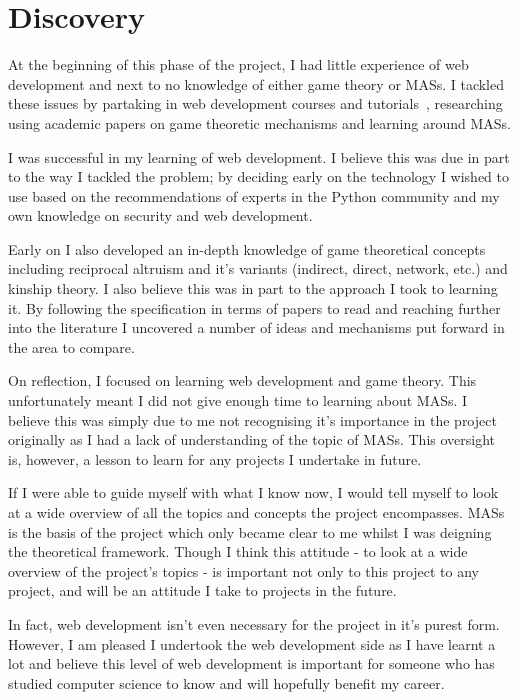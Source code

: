 \documentclass[]{final_report}
\begin{document}
\section{Discovery}
At the beginning of this phase of the project, I had little experience of web development and next to no knowledge of either game theory or MASs. I tackled these issues by partaking in web development courses and tutorials~\cite{flask_tut, swi_web_tut}, researching using academic papers on game theoretic mechanisms and learning around MASs.\par 
I was successful in my learning of web development. I believe this was due in part to the way I tackled the problem; by deciding early on the technology I wished to use based on the recommendations of experts in the Python community and my own knowledge on security and web development.\par 
Early on I also developed an in-depth knowledge of game theoretical concepts including reciprocal altruism and it's variants (indirect, direct, network, etc.) and kinship theory. I also believe this was in part to the approach I took to learning it. By following the specification in terms of papers to read and reaching further into the literature I uncovered a number of ideas and mechanisms put forward in the area to compare.\par 
On reflection, I focused on learning web development and game theory. This unfortunately meant I did not give enough time to learning about MASs. I believe this was simply due to me not recognising it's importance in the project originally as I had a lack of understanding of the topic of MASs. This oversight is, however, a lesson to learn for any projects I undertake in future.\par
If I were able to guide myself with what I know now, I would tell myself to look at a wide overview of all the topics and concepts the project encompasses. MASs is the basis of the project which only became clear to me whilst I was deigning the theoretical framework. Though I think this attitude - to look at a wide overview of the project's topics - is important not only to this project to any project, and will be an attitude I take to projects in the future.\par 
In fact, web development isn't even necessary for the project in it's purest form. However, I am pleased I undertook the web development side as I have learnt a lot and believe this level of web development is important for someone who has studied computer science to know and will hopefully benefit my career.
\end{document}
